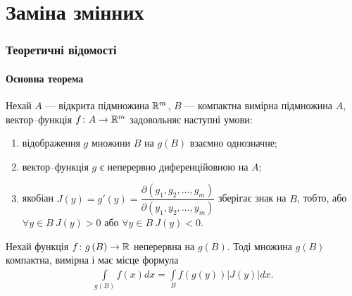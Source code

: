 \part{Заміна змінних}
\section{Теоретичні відомості}
\subsection{Основна теорема}
\begin{theorem}
Нехай $A$ --- відкрита підмножина $\mathbb{R}^{m}$, $B$ --- компактна вимірна підмножина $A$, вектор--функція ${f\colon A\to\mathbb{R}^{m}}$ задовольняє наступні умови:
\begin{enumerate}
\item відображення $g$ множини $B$ на ${g\left(B\right)}$ взаємно однозначне;
\item вектор--функція $g$ є неперервно диференційовною на $A$;
\item якобіан ${J(y) = g'(y) = \dfrac{\partial\left(g_1,g_2, \ldots, g_m\right)}{\partial\left(y_1,y_2, \ldots, y_m\right)}}$ зберігає знак на $B$, тобто, або ${\forall y\in B\ J(y)>0}$ або ${\forall y\in B\ J(y)<0}$.
\end{enumerate}
Нехай функція ${f\colon g\left(B\right)\to \mathbb{R}}$ неперервна на ${g\left(B\right)}$. Тоді множина ${g\left(B\right)}$ компактна, вимірна і має місце формула
\begin{align*}
\boxed{\int\limits_{g\left(B\right)} f(x) dx = \int\limits_{B} f\left(g\left(y\right)\right) \left|J(y)\right| dx.}
\end{align*}
\end{theorem}
